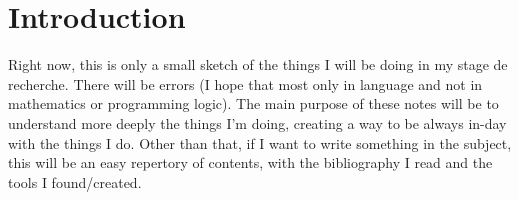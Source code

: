 \section{Introduction}

Right now, this is only a small sketch of the things I will be doing in my stage de recherche. There will be errors (I hope that most only in language and not in mathematics or programming logic).
The main purpose of these notes will be to understand more deeply the things I'm doing, creating a way to be always in-day with the things I do. Other than that, if I want to write something in the subject, this will be an easy repertory of contents, with the bibliography I read and the tools I found/created.
